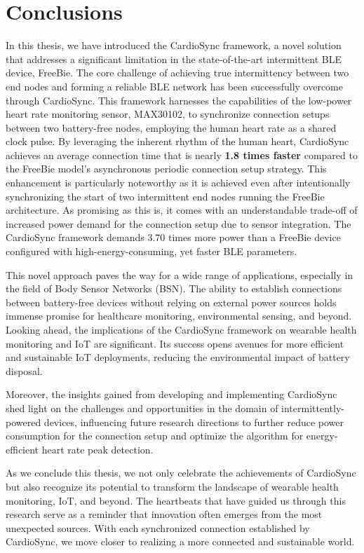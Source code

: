 \chapter{Conclusions}
\label{chp:conclusions}
In this thesis, we have introduced the CardioSync framework, a novel solution that addresses a significant limitation in the state-of-the-art intermittent BLE device, FreeBie. The core challenge of achieving true intermittency between two end nodes and forming a reliable BLE network has been successfully overcome through CardioSync. This framework harnesses the capabilities of the low-power heart rate monitoring sensor, MAX30102, to synchronize connection setups between two battery-free nodes, employing the human heart rate as a shared clock pulse. By leveraging the inherent rhythm of the human heart, CardioSync achieves an average connection time that is nearly \textbf{1.8 times faster} compared to the FreeBie model's asynchronous periodic connection setup strategy. This enhancement is particularly noteworthy as it is achieved even after intentionally synchronizing the start of two intermittent end nodes running the FreeBie architecture. As promising as this is, it comes with an understandable trade-off of increased power demand for the connection setup due to sensor integration. The CardioSync framework demands 3.70 times more power than a FreeBie device configured with high-energy-consuming, yet faster BLE parameters.

\noindent This novel approach paves the way for a wide range of applications, especially in the field of Body Sensor Networks (BSN). The ability to establish connections between battery-free devices without relying on external power sources holds immense promise for healthcare monitoring, environmental sensing, and beyond. Looking ahead, the implications of the CardioSync framework on wearable health monitoring and IoT are significant. Its success opens avenues for more efficient and sustainable IoT deployments, reducing the environmental impact of battery disposal.

\noindent Moreover, the insights gained from developing and implementing CardioSync shed light on the challenges and opportunities in the domain of intermittently-powered devices, influencing future research directions to further reduce power consumption for the connection setup and optimize the algorithm for energy-efficient heart rate peak detection.

\noindent As we conclude this thesis, we not only celebrate the achievements of CardioSync but also recognize its potential to transform the landscape of wearable health monitoring, IoT, and beyond. The heartbeats that have guided us through this research serve as a reminder that innovation often emerges from the most unexpected sources. With each synchronized connection established by CardioSync, we move closer to realizing a more connected and sustainable world.